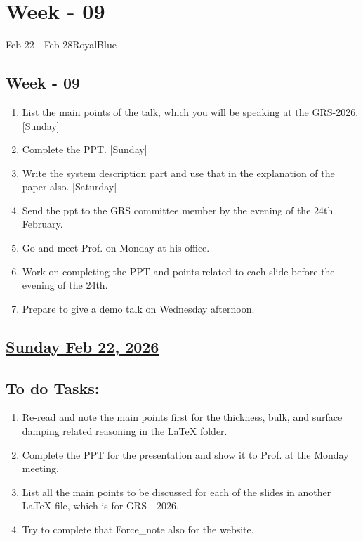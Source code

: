 \section{Week - 09}
\begin{physicsmodule}{Feb 22 - Feb 28}{RoyalBlue}
  \begin{lawbox}
    \subsection*{\sffamily\bfseries Week - 09}
    \begin{enumerate}
    \item List the main points of the talk, which you will be speaking at the GRS-2026. [Sunday]
    \item Complete the PPT. [Sunday]
    \item Write the system description part and use that in the explanation of the paper also. [Saturday]
    \item Send the ppt to the GRS committee member by the evening of the 24th February.
    \item Go and meet Prof. on Monday at his office.
    \item Work on completing the PPT and points related to each slide before the evening of the 24th.
    \item Prepare to give a demo talk on Wednesday afternoon.
\end{enumerate}
  \end{lawbox}
\end{physicsmodule}
\subsection*{\underline{Sunday Feb 22, 2026}}
\subsection*{To do Tasks:}
\begin{enumerate}
    \item Re-read and note the main points first for the thickness, bulk, and surface damping related reasoning in the {\LaTeX} folder.\cmark 
    \item Complete the PPT for the presentation and show it to Prof. at the Monday meeting. \cmark
    \item List all the main points to be discussed for each of the slides in another {\LaTeX} file, which is for GRS - 2026. \cmark
    \item Try to complete that Force\_note also for the website. \xmark
\end{enumerate}
